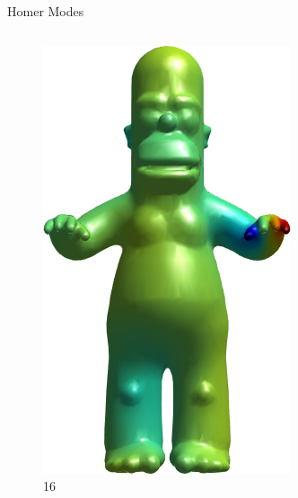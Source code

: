 \documentclass{beamer}
\begin{document}
\begin{frame}{Homer Modes}
\begin{columns}
\begin{column}[T]{3cm}
\begin{figure}[t]
    \includegraphics[width=\textwidth]{Harmonics/HomerModes/16.png}
    \caption*{\huge 16}
\end{figure}
\end{column}
\begin{column}[T]{3cm}
\begin{figure}[t]


\end{figure}
\end{column}
\end{columns}
\end{frame}
\end{document}
